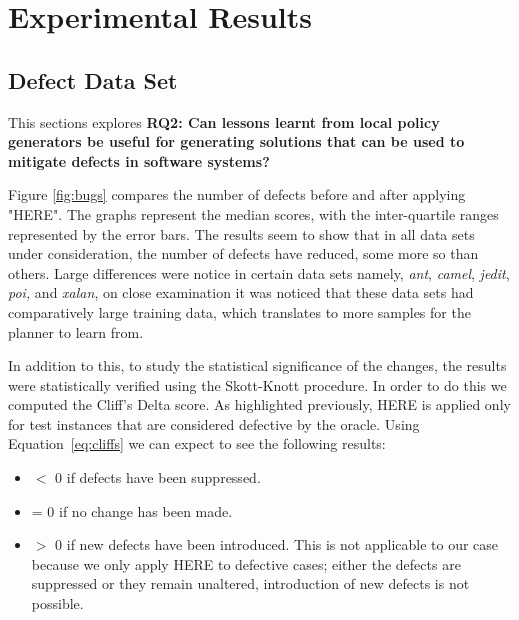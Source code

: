 \documentclass[conference]{IEEEtran}
\newcommand{\eq}[1]{Equation~\ref{eq:#1}}
\newcommand{\bi}{\begin{itemize}}
\newcommand{\ei}{\end{itemize}}
\begin{document}
\section{Experimental Results}

\subsection{Defect Data Set}
This sections explores \textbf{RQ2: Can lessons learnt from local policy generators be useful for generating solutions that can be used to mitigate defects in software systems?}

Figure \ref{fig:bugs} compares the number of defects before and after applying "HERE". The graphs represent the median scores, with the inter-quartile ranges represented by the error bars. The results seem to show that in all data sets under consideration, the number of defects have reduced, some more so than others. Large differences were notice in certain data sets namely, \textit{ant}, \textit{camel}, \textit{jedit}, \textit{poi,} and \textit{xalan}, on close examination it was noticed that these data sets had comparatively large training data, which translates to more samples for the planner to learn from.

In addition to this, to study the statistical significance of the changes, the results were statistically verified using the Skott-Knott procedure. In order to do this we computed the Cliff's Delta score. As highlighted previously, HERE is applied only for test instances that are considered defective by the oracle. Using \eq{cliffs} we can expect to see the following results:

\bi
\item $\lt$ 0 if defects have been suppressed.
\item = 0 if no change has been made.
\item $\gt$ 0 if new defects have been introduced. This is not applicable to our case because we only apply HERE to defective cases; either the defects are suppressed or they remain unaltered, introduction of new defects is not possible.
\ei
\end{document}
